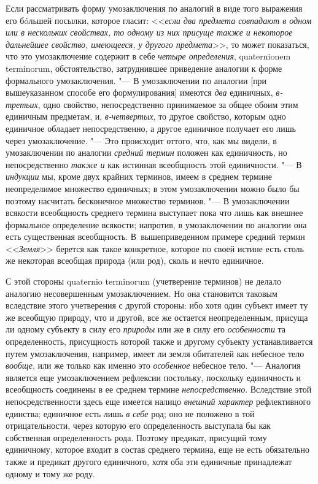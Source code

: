 {{Если рассматривать форму умозаключения по аналогий в виде того
выражения его бóльшей посылки, которое гласит:
<<{\em если два предмета совпадают в
одном или в нескольких свойствах, то одному из них присуще также и
некоторое дальнейшее свойство, имеющееся, у другого предмета}>>,
то может показаться, что это умозаключение содержит в себе
{\em четыре определения}, quaternionem
terminorum, обстоятельство, затруднившее приведение аналогии
к форме формального умозаключения. "--- В умозаключении по
аналогии [при вышеуказанном способе его формулирования] имеются
{\em два} единичных,
{\em в-третьих}, одно
свойство, непосредственно принимаемое за общее обоим этим единичным
предметам, и, {\em в-четвертых},
то другое свойство, которым одно единичное обладает
непосредственно, а другое единичное получает его лишь через умозаключение.
"--- Это происходит оттого, что, как мы видели, в умозаключении
по аналогии {\em средний термин}
положен как единичность, но непосредственно
{\em также и} как
истинная всеобщность этой единичности. "--- В
{\em индукции} мы, кроме
двух крайних терминов, имеем в среднем термине неопределимое множество
единичных; в этом умозаключении можно было бы поэтому насчитать бесконечное
множество терминов. "--- В умозаключении всякости всеобщность
среднего термина выступает пока что лишь как внешнее формальное определение
всякости; напротив, в умозаключении по аналогии она есть существенная
всеобщность. В~вышеприведенном примере средний термин
<<{\em Земля}>> берется как
такое конкретное, которое по своей истине есть столь же некоторая всеобщая
природа (или род), сколь и нечто единичное.

С этой стороны quaternio terminorum
(учетверение терминов) не делало аналогию несовершенным
умозаключением. Но она становится таковым вследствие этого учетверения с
другой стороны: ибо хотя один субъект имеет ту же всеобщую природу, что и
другой, все же остается неопределенным, присуща ли одному субъекту в силу
его {\em природы} или же
в силу его {\em особенности}
та определенность, присущность которой также и другому
субъекту устанавливается путем умозаключения, например, имеет ли земля
обитателей как небесное тело
{\em вообще}, или же
только как именно это {\em особенное}
небесное тело. "--- Аналогия является еще
умозаключением рефлексии постольку, поскольку единичность и всеобщность
соединены в ее среднем термине
{\em непосредственно}.
Вследствие этой непосредственности здесь еще имеется налицо
{\em внешний характер}
рефлективного единства; единичное есть лишь
{\em в себе} род; оно не
положено в той отрицательности, через которую его определенность выступала
бы как собственная определенность рода. Поэтому предикат, присущий тому
единичному, которое входит в состав среднего термина, еще не есть
обязательно также и предикат другого единичного, хотя оба эти единичные
принадлежат одному и тому же роду.

}}
